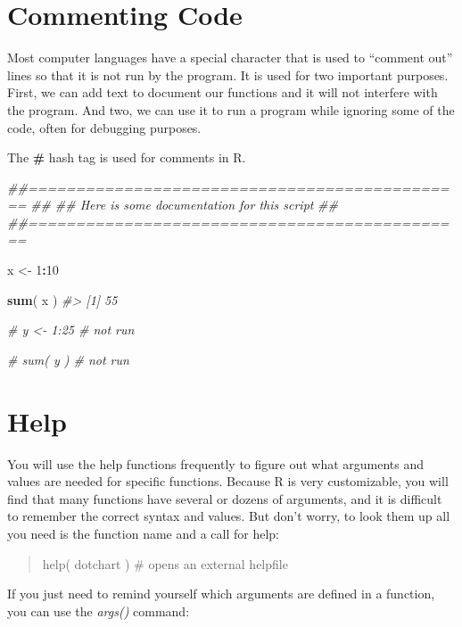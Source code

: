 \documentclass[]{book}
\newenvironment{Shaded}{\begin{snugshade}}{\end{snugshade}}
\newcommand{\CommentTok}[1]{\textcolor[rgb]{0.56,0.35,0.01}{\textit{#1}}}
\newcommand{\DecValTok}[1]{\textcolor[rgb]{0.00,0.00,0.81}{#1}}
\newcommand{\KeywordTok}[1]{\textcolor[rgb]{0.13,0.29,0.53}{\textbf{#1}}}
\newcommand{\NormalTok}[1]{#1}
\newcommand{\OperatorTok}[1]{\textcolor[rgb]{0.81,0.36,0.00}{\textbf{#1}}}
\newcommand{\StringTok}[1]{\textcolor[rgb]{0.31,0.60,0.02}{#1}}
\theoremstyle{definition}
\theoremstyle{definition}
\theoremstyle{definition}
\theoremstyle{remark}
\begin{document}
\hypertarget{commenting-code}{%
\section{Commenting Code}\label{commenting-code}}

Most computer languages have a special character that is used to
``comment out'' lines so that it is not run by the program. It is used
for two important purposes. First, we can add text to document our
functions and it will not interfere with the program. And two, we can
use it to run a program while ignoring some of the code, often for
debugging purposes.

The \textbf{\#} hash tag is used for comments in R.

\begin{Shaded}
\begin{Highlighting}[]

\CommentTok{##==============================================}
\CommentTok{##}
\CommentTok{##  Here is some documentation for this script}
\CommentTok{##}
\CommentTok{##==============================================}

\NormalTok{x <-}\StringTok{ }\DecValTok{1}\OperatorTok{:}\DecValTok{10}

\KeywordTok{sum}\NormalTok{( x )}
\CommentTok{#> [1] 55}

\CommentTok{# y <- 1:25     # not run}

\CommentTok{# sum( y )      # not run}
\end{Highlighting}
\end{Shaded}

\hypertarget{help}{%
\section{Help}\label{help}}

You will use the help functions frequently to figure out what arguments
and values are needed for specific functions. Because R is very
customizable, you will find that many functions have several or dozens
of arguments, and it is difficult to remember the correct syntax and
values. But don't worry, to look them up all you need is the function
name and a call for help:

\begin{quote}
help( dotchart ) \# opens an external helpfile
\end{quote}

If you just need to remind yourself which arguments are defined in a
function, you can use the \emph{args()} command:
\end{document}
